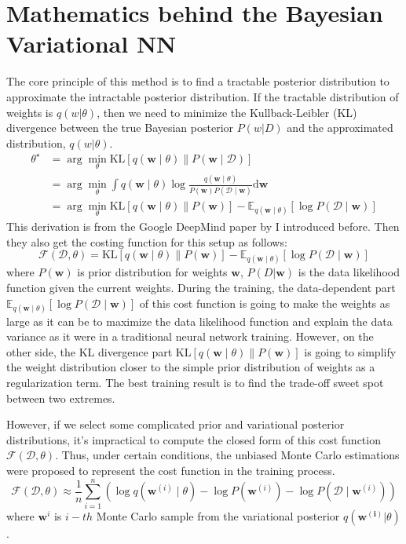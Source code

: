 \documentclass{article}
\begin{document}
\section{Mathematics behind the Bayesian Variational NN}
The core principle of this method is to find a tractable posterior distribution to approximate the intractable posterior distribution. If the tractable distribution of weights is $q(w|\theta)$, then we need to minimize the Kullback-Leibler (KL) divergence between the true Bayesian posterior $P(w|D)$ and the approximated distribution, $q(w|\theta)$. 
$$\begin{aligned}
\theta^{\star} & =\arg \min _\theta \mathrm{KL}[q(\mathbf{w} \mid \theta) \| P(\mathbf{w} \mid \mathcal{D})] \\
& =\arg \min _\theta \int q(\mathbf{w} \mid \theta) \log \frac{q(\mathbf{w} \mid \theta)}{P(\mathbf{w}) P(\mathcal{D} \mid \mathbf{w})} \mathrm{d} \mathbf{w} \\
& =\arg \min _\theta \mathrm{KL}[q(\mathbf{w} \mid \theta) \| P(\mathbf{w})]-\mathbb{E}_{q(\mathbf{w} \mid \theta)}[\log P(\mathcal{D} \mid \mathbf{w})]
\end{aligned}$$ This derivation is from the Google DeepMind paper by \textcite{blundell2015weightuncertaintyneuralnetworks} I introduced before. Then they also get the costing function for this setup as follows: 
$$\mathcal{F}(\mathcal{D}, \theta)=\mathrm{KL}[q(\mathbf{w} \mid \theta) \| P(\mathbf{w})]  -\mathbb{E}_{q(\mathbf{w} \mid \theta)}[\log P(\mathcal{D} \mid \mathbf{w})]$$ where $P(\mathbf{w})$ is prior distribution for weights $\mathbf{w}$, $P(D|\mathbf{w})$ is the data likelihood function given the current weights. During the training, the data-dependent part $\mathbb{E}_{q(\mathbf{w} \mid \theta)}[\log P(\mathcal{D} \mid \mathbf{w})]$ of this cost function is going to make the weights as large as it can be to maximize the data likelihood function and explain the data variance as it were in a traditional neural network training. However, on the other side, the KL divergence part $\mathrm{KL}[q(\mathbf{w} \mid \theta) \| P(\mathbf{w})]$ is going to simplify the weight distribution closer to the simple prior distribution of weights as a regularization term. The best training result is to find the trade-off sweet spot between two extremes. 

However, if we select some complicated prior and variational posterior distributions, it's impractical to compute the closed form of this cost function $\mathcal{F}(\mathcal{D}, \theta)$. Thus, under certain conditions, the unbiased Monte Carlo estimations were proposed to represent the cost function in the training process. 
$$\mathcal{F}(\mathcal{D}, \theta) \approx \frac{1}{n}\sum_{i=1}^n \left(\log q\left(\mathbf{w}^{(i)} \mid \theta\right)- \log P\left(\mathbf{w}^{(i)}\right) -\log P\left(\mathcal{D} \mid \mathbf{w}^{(i)}\right)\right)$$ where $\mathbf{w}^{i}$ is $i-th$ Monte Carlo sample from the variational posterior $q(\mathbf{w^{(i)}}|\theta)$.
\end{document}

